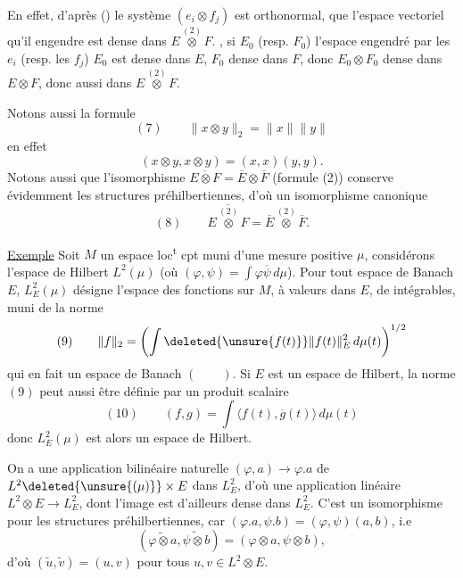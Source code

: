 En effet, d'après () le système $(e_i\otimes f_j)$ est orthonormal, 
  que l'espace vectoriel qu'il engendre est dense dans $E\overset{(2)}\otimes F$.
, si $E_0$ (resp. $F_0$)   l'espace engendré par les $e_i$ (resp. les $f_j$)  
$E_0$ est dense dans $E$, $F_0$ dense dans $F$, donc $E_0\otimes F_0$ dense dans $E\otimes F$, donc aussi dans $E\overset{(2)}\otimes F$.

Notons aussi la formule
\[
(7)\qquad\boxed{\|x\otimes y\|_2=\|x\|\|y\|}
\]
 en effet  
\[
(x\otimes y,x\otimes y)=(x,x)(y,y).
\]
Notons aussi que l'isomorphisme  $\overline{E\otimes F}=\overline E\otimes\overline F$ (formule (2)) conserve évidemment les structures préhilbertiennes, d'où un isomorphisme canonique
\[
(8)\qquad\overline{E\overset{(2)}\otimes F}=\overline E\overset{(2)}\otimes\overline F.
\]



\uline{Exemple} Soit $M$ un espace loc\textsuperscript{t} cpt muni d'une
mesure positive $\mu$, considérons l'espace de Hilbert
$L^2(\mu)$ (où $(\varphi,\psi)=\int\varphi\overline\psi\,d\mu$).
Pour tout espace de Banach $E$, $L^2_E(\mu)$ désigne l'espace des
fonctions sur $M$, à valeurs dans $E$, de 
intégrables, muni de la norme
\[
(9)\qquad
\|f\|_2=\left(\int \deleted{\unsure{f(t)}}\|f(t)\|_E^2\,d\mu(t)\right)^{1/2}
\]
qui en fait un espace de Banach $(\qquad)$. Si
$E$ est un espace de Hilbert, la norme $(9)$ peut
aussi être définie par un produit scalaire
\[
(10)\qquad (f,g)=\int\langle f(t),\overline g(t)\rangle\,d\mu(t)
\]
donc $L^2_E(\mu)$ est alors un espace de Hilbert.

On a une application bilinéaire naturelle
$(\varphi,a)\longrightarrow\varphi.a$ de $L^2\deleted{\unsure{(\mu)}}\times E$ dans $L^2_E$,
d'où une application linéaire 
$L^2\otimes E\longrightarrow L^2_E$, dont
l'image est d'ailleurs dense dans $L^2_E$. 
 C'est un isomorphisme pour les structures
préhilbertiennes, car 
$(\varphi.a,\psi.b)=(\varphi,\psi)(a,b)$,
i.e
\[
(\widetilde{\varphi\otimes a},\widetilde{\psi\otimes b})
=(\varphi\otimes a,\psi\otimes b),
\]
d'où  $(\widetilde u,\widetilde v)=(u,v)$
pour tous $u,v\in L^2\otimes E$.
